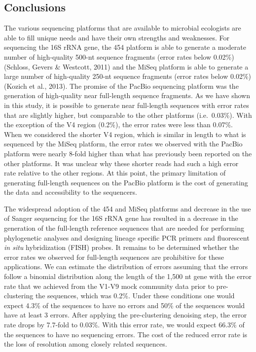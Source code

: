 \documentclass[11pt,]{article}
\begin{document}
\subsection{Conclusions}\label{conclusions}

The various sequencing platforms that are available to microbial
ecologists are able to fill unique needs and have their own strengths
and weaknesses. For sequencing the 16S rRNA gene, the 454 platform is
able to generate a moderate number of high-quality 500-nt sequence
fragments (error rates below 0.02\%) (Schloss, Gevers \& Westcott, 2011)
and the MiSeq platform is able to generate a large number of
high-quality 250-nt sequence fragments (error rates below 0.02\%)
(Kozich et al., 2013). The promise of the PacBio sequencing platform was
the generation of high-quality near full-length sequence fragments. As
we have shown in this study, it is possible to generate near full-length
sequences with error rates that are slightly higher, but comparable to
the other platforms (i.e.~0.03\%). With the exception of the V4 region
(0.2\%), the error rates were less than 0.07\%. When we considered the
shorter V4 region, which is similar in length to what is sequenced by
the MiSeq platform, the error rates we observed with the PacBio platform
were nearly 8-fold higher than what has previously been reported on the
other platforms. It was unclear why these shorter reads had such a high
error rate relative to the other regions. At this point, the primary
limitation of generating full-length sequences on the PacBio platform is
the cost of generating the data and accessibility to the sequencers.

The widespread adoption of the 454 and MiSeq platforms and decrease in
the use of Sanger sequencing for the 16S rRNA gene has resulted in a
decrease in the generation of the full-length reference sequences that
are needed for performing phylogenetic analyses and designing lineage
specific PCR primers and fluorescent \emph{in situ} hybridization (FISH)
probes. It remains to be determined whether the error rates we observed
for full-length sequences are prohibitive for these applications. We can
estimate the distribution of errors assuming that the errors follow a
binomial distribution along the length of the 1,500 nt gene with the
error rate that we achieved from the V1-V9 mock community data prior to
pre-clustering the sequences, which was 0.2\%. Under these conditions
one would expect 4.3\% of the sequences to have no errors and 50\% of
the sequences would have at least 3 errors. After applying the
pre-clustering denoising step, the error rate drops by 7.7-fold to
0.03\%. With this error rate, we would expect 66.3\% of the sequences to
have no sequencing errors. The cost of the reduced error rate is the
loss of resolution among closely related sequences.
\end{document}
